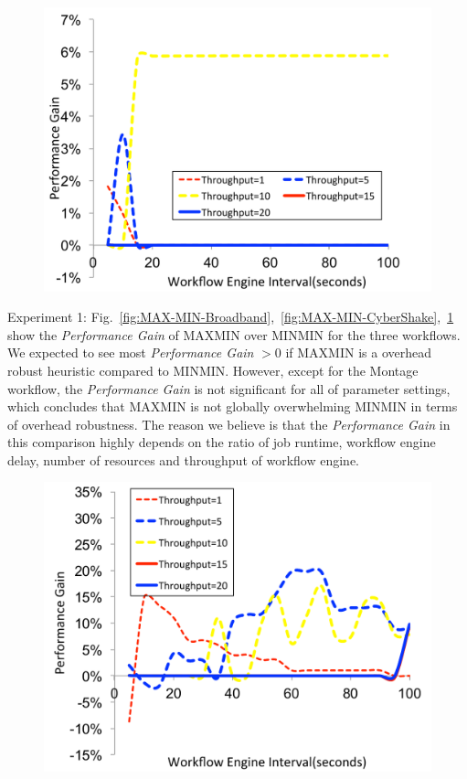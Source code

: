 \documentclass[final,5p,times,twocolumn]{elsarticle}
\begin{document}
\begin{figure}[!htb]
\centering
 \includegraphics[width=0.9\linewidth]{figure/MAX-MIN-Montage.pdf}
  \label{fig:MAX-MIN-Montage}
  \vspace{-10pt}
\end{figure}


Experiment 1: Fig.~\ref{fig:MAX-MIN-Broadband},~\ref{fig:MAX-MIN-CyberShake},~\ref{fig:MAX-MIN-Montage} show the  \emph{Performance Gain} of MAXMIN over MINMIN for the three workflows. We expected to see most  \emph{Performance Gain} $>0$ if MAXMIN is a overhead robust heuristic compared to MINMIN. However, except for the Montage workflow, the \emph{Performance Gain} is not significant for all of parameter settings, which concludes that MAXMIN is not globally overwhelming MINMIN in terms of overhead robustness. The reason we believe is that the  \emph{Performance Gain} in this comparison highly depends on the ratio of job runtime, workflow engine delay, number of resources and throughput of workflow engine. 

\begin{figure}[!htb]
\centering
 \includegraphics[width=0.9\linewidth]{figure/DFS-BFS-Broadband.pdf}
  \label{fig:DFS-BFS-Broadband}
  \vspace{-10pt}
\end{figure}
\end{document}
